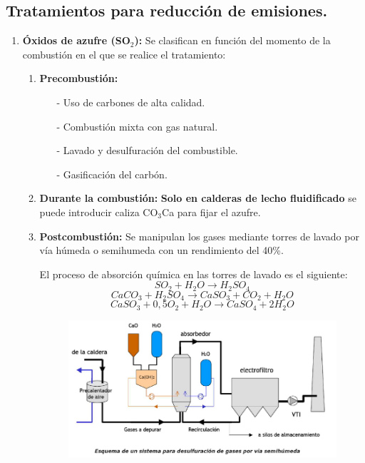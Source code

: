 \subsection{Tratamientos para reducción de emisiones.}
\begin{enumerate}
	\item \textbf{Óxidos de azufre (SO$_2$):}
	Se clasifican en función del momento de la combustión en el que se realice el tratamiento:
	\begin{enumerate}
		\item \textbf{Precombustión:} 
		\begin{itemize}
			\item [-] Uso de carbones de alta calidad.
			\item [-] Combustión mixta con gas natural.
			\item [-] Lavado y desulfuración del combustible.
			\item [-] Gasificación del carbón.
		\end{itemize}
		\item \textbf{Durante la combustión:}
		\textbf{Solo en calderas de lecho fluidificado} se puede introducir caliza CO$_3$Ca para fijar el azufre. 
		\item \textbf{Postcombustión:}
			Se manipulan los gases mediante torres de lavado por vía húmeda o semihumeda con un rendimiento del 40\%.
			
			El proceso de absorción química en las torres de lavado es el siguiente:
			\[SO_2+H_2O\rightarrow H_2SO_4\]
			\[CaCO_3+H_2SO_4\rightarrow CaSO_3+CO_2+H_2O\]
			\[CaSO_3+0,5O_2+H_2O\rightarrow CaSO_4+2H_2O\]
			\begin{figure}[H]
				\centering
				\includegraphics[width=0.5\linewidth]{res/tema2/desulfuric}
				\label{fig:desulfuric}
			\end{figure}
			

\end{enumerate}
\end{enumerate}
